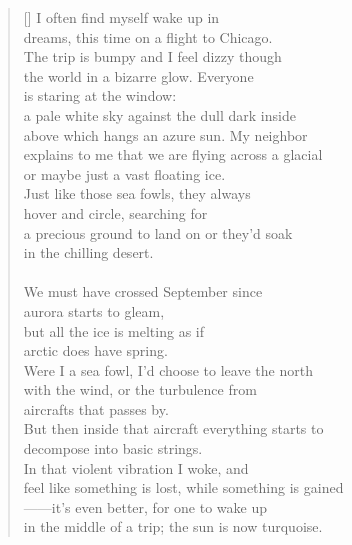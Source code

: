 \documentclass{book}
\begin{document}
\newpage
{}
\settowidth{\versewidth}{feel like something is lost, while something is gained}
\begin{verse}[\versewidth]
    I often find myself wake up in \\
    dreams, this time on a flight to Chicago. \\
    The trip is bumpy and I feel dizzy though \\
    the world in a bizarre glow. Everyone \\
    is staring at the window: \\
    a pale white sky against the dull dark inside \\
    above which hangs an azure sun. My neighbor \\
    explains to me that we are flying across a glacial \\
    or maybe just a vast floating ice. \\
    Just like those sea fowls, they always \\
    hover and circle, searching for \\
    a precious ground to land on or they'd soak \\
    in the chilling desert. \\
    \hspace*{\fill} \\
    We must have crossed September since \\
    aurora starts to gleam, \\
    but all the ice is melting as if \\
    arctic does have spring. \\
    Were I a sea fowl, I'd choose to leave the north \\
    with the wind, or the turbulence from \\
    aircrafts that passes by. \\
    But then inside that aircraft everything starts to \\
    decompose into basic strings. \\
    In that violent vibration I woke, and \\
    feel like something is lost, while something is gained \\
    ——it's even better, for one to wake up \\
    in the middle of a trip; the sun is now turquoise. \\
\end{verse}

\newpage
\begin{coverpage}
    \thispagestyle{empty}
    \noindent\fboxsep=0pt
\end{coverpage}
\end{document}
